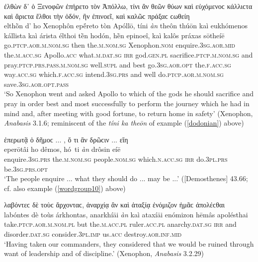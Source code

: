 \begin{exe}
\ex ἐλθὼν δ᾽ ὁ Ξενοφῶν ἐπήρετο τὸν Ἀπόλλω, τίνι ἂν θεῶν θύων καὶ εὐχόμενοϲ κάλλιϲτα καὶ ἄριϲτα ἔλθοι τὴν ὁδόν, ἣν ἐπινοεῖ, καὶ καλῶϲ πράξαϲ ϲωθείη\\
\gll elthṑn d' ho Xenophôn epḗreto tòn Apóllō, tíni \emph{àn} theôn thúōn kaì eukhómenos kállista kaì árista élthoi tḕn hodón, hḕn epinoeî, kaì kalôs práxas sōtheíē\\
go.\textsc{ptcp.aor.m.nom.sg} then the.\textsc{m.nom.sg} Xenophon.\textsc{nom} enquire.\textsc{3sg.aor.mid} the.\textsc{m.acc.sg} Apollo.\textsc{acc} what.\textsc{m.dat.sg} \textsc{irr} god.\textsc{gen.pl} sacrifice.\textsc{ptcp.m.nom.sg} and pray.\textsc{ptcp.prs.pass.m.nom.sg} well.\textsc{supl} and best go.\textsc{3sg.aor.opt} the.\textsc{f.acc.sg} way.\textsc{acc.sg} which.\textsc{f.acc.sg} intend.\textsc{3sg.prs} and well do.\textsc{ptcp.aor.m.nom.sg} save.\textsc{3sg.aor.opt.pass}\\
\trans `So Xenophon went and asked Apollo to which of the gods he should sacrifice and pray in order best and most successfully to perform the journey which he had in mind and, after meeting with good fortune, to return home in safety' (Xenophon, \textit{Anabasis} 3.1.6; reminiscent of the \textit{tíni ka theōn} of example (\ref{dodonian}) above)
\label{wordgroup26}
\end{exe}

\begin{exe}
\ex ἐπερωτᾷ ὁ δῆμοϲ ... , ὅ τι ἂν δρῶϲιν ... εἵη\\
\gll eperōtâi ho dêmos, hó~ti \emph{àn} drôsin eíē\\
enquire.\textsc{3sg.prs} the.\textsc{m.nom.sg} people.\textsc{nom.sg} which.\textsc{n.acc.sg} \textsc{irr} do.\textsc{3pl.prs} be.\textsc{3sg.prs.opt}\\
\trans `The people enquire ... what they should do ... may be ...' ({[}Demosthenes{]} 43.66; cf. also example (\ref{wordgroup10}) above)
\label{wordgroup27}
\end{exe}

\begin{exe}
\ex λαβόντεϲ δὲ τοὺϲ ἄρχονταϲ, ἀναρχίᾳ ἂν καὶ ἀταξίᾳ ἐνόμιζον ἡμᾶϲ ἀπολέϲθαι\\
\gll labóntes dè toùs árkhontas, anarkhíāi \emph{àn} kaì ataxíāi enómizon hēmâs apolésthai\\
take.\textsc{ptcp.aor.m.nom.pl} but the.\textsc{m.acc.pl} ruler.\textsc{acc.pl} anarchy.\textsc{dat.sg} \textsc{irr} and disorder.\textsc{dat.sg} consider.\textsc{3pl.imp} us.\textsc{acc} destroy.\textsc{aor.inf.mid}\\
\trans `Having taken our commanders, they considered that we would be ruined through want of leadership and of discipline.' (Xenophon, \textit{Anabasis} 3.2.29)
\label{wordgroup28}
\end{exe}

